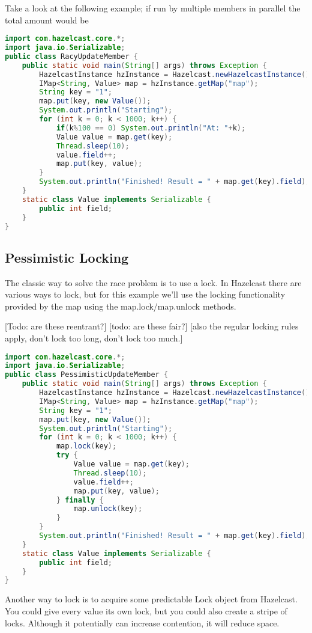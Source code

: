 Take a look at the following example; if run by multiple members in parallel the total amount would be 
\begin{lstlisting}[language=java]
import com.hazelcast.core.*;
import java.io.Serializable;
public class RacyUpdateMember {
    public static void main(String[] args) throws Exception {
        HazelcastInstance hzInstance = Hazelcast.newHazelcastInstance();
        IMap<String, Value> map = hzInstance.getMap("map");
        String key = "1";
        map.put(key, new Value());
        System.out.println("Starting");
        for (int k = 0; k < 1000; k++) {
            if(k%100 == 0) System.out.println("At: "+k);
            Value value = map.get(key);
            Thread.sleep(10);
            value.field++;
            map.put(key, value);
        }
        System.out.println("Finished! Result = " + map.get(key).field);
    }
    static class Value implements Serializable {
        public int field;
    }
}
\end{lstlisting}

\subsection{Pessimistic Locking}
The classic way to solve the race problem is to use a lock. In Hazelcast there are various ways to lock, but for this example we'll use the locking functionality provided by the map using the map.lock/map.unlock methods.

[Todo: are these reentrant?]
[todo: are these fair?]
[also the regular locking rules apply, don't lock too long, don't lock too much.]

\begin{lstlisting}[language=java]
import com.hazelcast.core.*;
import java.io.Serializable;
public class PessimisticUpdateMember {
    public static void main(String[] args) throws Exception {
        HazelcastInstance hzInstance = Hazelcast.newHazelcastInstance();
        IMap<String, Value> map = hzInstance.getMap("map");
        String key = "1";
        map.put(key, new Value());
        System.out.println("Starting");
        for (int k = 0; k < 1000; k++) {
            map.lock(key);
            try {
                Value value = map.get(key);
                Thread.sleep(10);
                value.field++;
                map.put(key, value);
            } finally {
                map.unlock(key);
            }
        }
        System.out.println("Finished! Result = " + map.get(key).field);
    }
    static class Value implements Serializable {
        public int field;
    }
}
\end{lstlisting}
Another way to lock is to acquire some predictable Lock object from Hazelcast. You could give every value its own lock, but you could also create a stripe of locks. Although it potentially can increase contention, it will reduce space.

